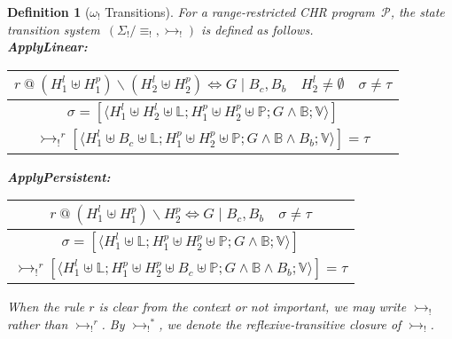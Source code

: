 \documentclass{tlp}
\newtheorem{definition}{Definition}[section]
\newcommand{\B}{\ensuremath{\mathbb{B}}}
\newcommand{\bL}{\ensuremath{\mathbb{L}}}
\newcommand{\mcP}{\ensuremath{\mathcal{P}}}
\newcommand{\bP}{\ensuremath{\mathbb{P}}}
\newcommand{\V}{\ensuremath{\mathbb{V}}}
\newcommand{\bang}{\ensuremath{!}}
\def\tuple#1{\langle #1 \rangle}
\newcommand{\stbang}[4]{\ensuremath{\tuple{#1; #2; #3; #4}}}
\newcommand{\obang}{\ensuremath{{\omega_\bang}}}
\newcommand{\Sbang}{\ensuremath{{\Sigma_{\bang}}}}
\newcommand{\ebang}{\ensuremath{\equiv_{\bang}}}
\newcommand{\der}{\ensuremath{\rightarrowtail}}
\newcommand{\derbang}{\ensuremath{\der_{\bang}}}
\begin{document}
\begin{definition}[$\obang$ Transitions] \label{def:new_opsem}
For a range-restricted CHR program~$\mcP$, the state transition
system~$(\Sbang/\!\!\ebang,\derbang)$ is defined as follows.\\
\textbf{ApplyLinear:}
\begin{center}
\begin{tabular*}{9cm}{c}
$r\ @\ (H_1^l \uplus H_1^p) \backslash (H_2^l \uplus H_2^p) \Leftrightarrow G
\mid B_c, B_b \quad H_2^l \ne \emptyset \quad \sigma \ne \tau$\\[-.05cm]
\hline
$\sigma = [\stbang{H_1^l \uplus H_2^l \uplus \bL}{H_1^p \uplus H_2^p \uplus
\bP}{G \land \B}{\V}]$\\
$\derbang^r [\stbang{H_1^l \uplus B_c \uplus \bL}{H_1^p \uplus H_2^p \uplus
\bP}{G \land \B \land B_b}{\V}] = \tau$
\end{tabular*}
\end{center}
\textbf{ApplyPersistent:}
\begin{center}
\begin{tabular*}{8.25cm}{c}
$r\ @\ (H_1^l \uplus H_1^p) \backslash H_2^p \Leftrightarrow G \mid B_c, B_b
\quad \sigma \ne \tau$\\[-.05cm]
\hline
$\sigma = [\stbang{H_1^l \uplus \bL}{H_1^p \uplus H_2^p \uplus \bP}{G \land
\B}{\V}]$\\
$\derbang^r [\stbang{H_1^l \uplus \bL}{H_1^p \uplus H_2^p \uplus B_c \uplus
\bP}{G \land \B \land B_b}{\V}] = \tau$
\end{tabular*}
\end{center}

When the rule $r$ is clear from the context or not important, we may write
$\derbang$ rather than $\derbang^r$. By $\derbang^*$, we denote the
reflexive-transitive closure of $\derbang$.
\end{definition}
\end{document}

